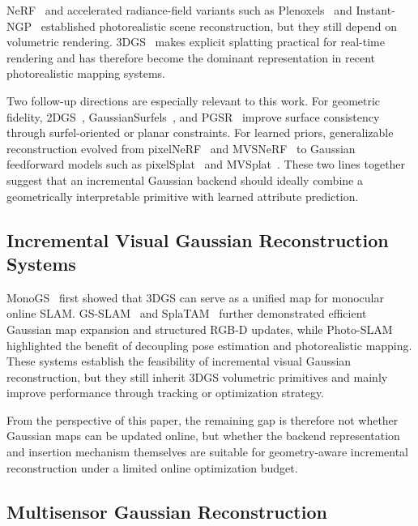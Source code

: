 \documentclass[lettersize,journal]{IEEEtran}
\begin{document}
NeRF~\cite{mildenhall2021nerf} and accelerated radiance-field variants such as Plenoxels~\cite{fridovich2022plenoxels} and Instant-NGP~\cite{muller2022instant} established photorealistic scene reconstruction, but they still depend on volumetric rendering. 3DGS~\cite{kerbl20233d} makes explicit splatting practical for real-time rendering and has therefore become the dominant representation in recent photorealistic mapping systems.

Two follow-up directions are especially relevant to this work. For geometric fidelity, 2DGS~\cite{huang20242d}, GaussianSurfels~\cite{dai2024high}, and PGSR~\cite{chen2024pgsr} improve surface consistency through surfel-oriented or planar constraints. For learned priors, generalizable reconstruction evolved from pixelNeRF~\cite{yu2021pixelnerf} and MVSNeRF~\cite{chen2021mvsnerf} to Gaussian feedforward models such as pixelSplat~\cite{charatan2024pixelsplat} and MVSplat~\cite{chen2024mvsplat}. These two lines together suggest that an incremental Gaussian backend should ideally combine a geometrically interpretable primitive with learned attribute prediction.

\subsection{Incremental Visual Gaussian Reconstruction Systems}

MonoGS~\cite{matsuki2024gaussian} first showed that 3DGS can serve as a unified map for monocular online SLAM. GS-SLAM~\cite{yan2024gs} and SplaTAM~\cite{keetha2024splatam} further demonstrated efficient Gaussian map expansion and structured RGB-D updates, while Photo-SLAM~\cite{huang2024photo} highlighted the benefit of decoupling pose estimation and photorealistic mapping. These systems establish the feasibility of incremental visual Gaussian reconstruction, but they still inherit 3DGS volumetric primitives and mainly improve performance through tracking or optimization strategy.

From the perspective of this paper, the remaining gap is therefore not whether Gaussian maps can be updated online, but whether the backend representation and insertion mechanism themselves are suitable for geometry-aware incremental reconstruction under a limited online optimization budget.

\subsection{Multisensor Gaussian Reconstruction}
\end{document}
